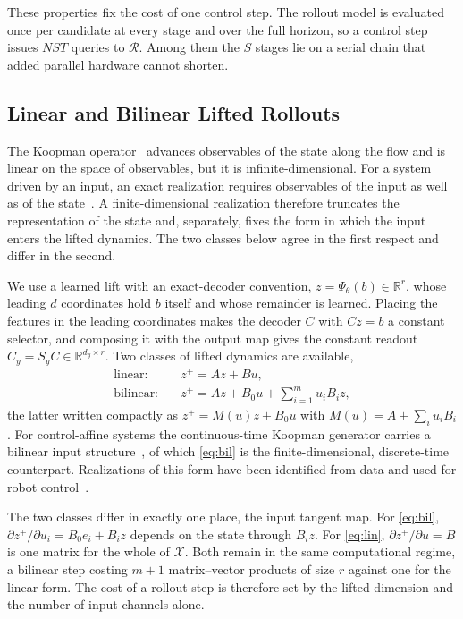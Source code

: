 \documentclass[letterpaper,10pt,conference]{ieeeconf}
\begin{document}
These properties fix the cost of one control step.
The rollout model is evaluated once per candidate at every stage and over the full horizon, so a control step issues $N S T$ queries to $\mathcal{R}$.
Among them the $S$ stages lie on a serial chain that added parallel hardware cannot shorten.

\subsection{Linear and Bilinear Lifted Rollouts}\label{subsec:koopman}

The Koopman operator~\cite{koopman1931, mezic2005} advances observables of the state along the flow and is linear on the space of observables, but it is infinite-dimensional.
For a system driven by an input, an exact realization requires observables of the input as well as of the state~\cite{iacob2024}.
A finite-dimensional realization therefore truncates the representation of the state and, separately, fixes the form in which the input enters the lifted dynamics.
The two classes below agree in the first respect and differ in the second.

We use a learned lift with an exact-decoder convention, $z = \Psi_\theta(b) \in \mathbb{R}^{r}$, whose leading $d$ coordinates hold $b$ itself and whose remainder is learned.
Placing the features in the leading coordinates makes the decoder $C$ with $Cz = b$ a constant selector, and composing it with the output map gives the constant readout $C_y = S_y C \in \mathbb{R}^{d_y \times r}$.
Two classes of lifted dynamics are available,
\begin{align}
\text{linear:} \quad & z^{+} = A z + B u ,
\label{eq:lin}\\[2pt]
\text{bilinear:} \quad & z^{+} = A z + B_0 u + \textstyle\sum_{i=1}^{m} u_i B_i z ,
\label{eq:bil}
\end{align}
the latter written compactly as $z^{+} = M(u)z + B_0 u$ with $M(u) = A + \sum_i u_i B_i$.
For control-affine systems the continuous-time Koopman generator carries a bilinear input structure~\cite{iacob2024}, of which \eqref{eq:bil} is the finite-dimensional, discrete-time counterpart.
Realizations of this form have been identified from data and used for robot control~\cite{bruder2021bilinear}.

The two classes differ in exactly one place, the input tangent map.
For \eqref{eq:bil}, $\partial z^{+}/\partial u_i = B_0 e_i + B_i z$ depends on the state through $B_i z$.
For \eqref{eq:lin}, $\partial z^{+}/\partial u = B$ is one matrix for the whole of $\mathcal{X}$.
Both remain in the same computational regime, a bilinear step costing $m+1$ matrix--vector products of size $r$ against one for the linear form.
The cost of a rollout step is therefore set by the lifted dimension and the number of input channels alone.
\end{document}
